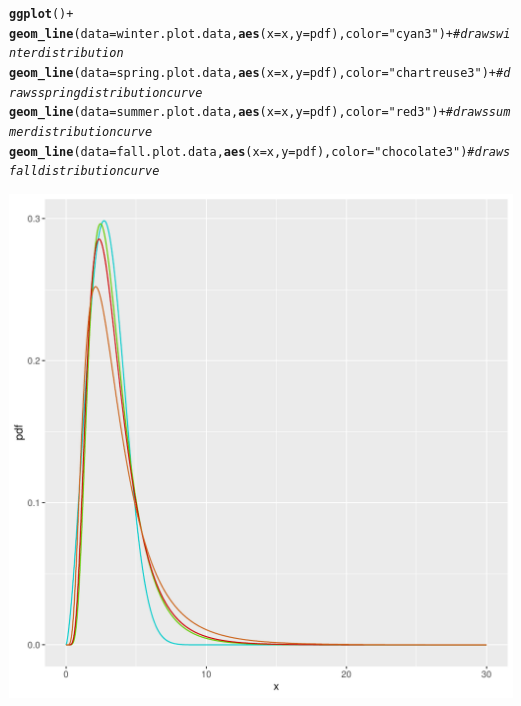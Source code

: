 \documentclass{article}\usepackage[]{graphicx}\usepackage[]{xcolor}
\makeatletter
\def\maxwidth{ %
  \ifdim\Gin@nat@width>\linewidth
    \linewidth
  \else
    \Gin@nat@width
  \fi
}
\newcommand{\hlsng}[1]{\textcolor[rgb]{0.192,0.494,0.8}{#1}}%
\newcommand{\hlcom}[1]{\textcolor[rgb]{0.678,0.584,0.686}{\textit{#1}}}%
\newcommand{\hlopt}[1]{\textcolor[rgb]{0,0,0}{#1}}%
\newcommand{\hldef}[1]{\textcolor[rgb]{0.345,0.345,0.345}{#1}}%
\newcommand{\hlkwc}[1]{\textcolor[rgb]{0.333,0.667,0.333}{#1}}%
\newcommand{\hlkwd}[1]{\textcolor[rgb]{0.737,0.353,0.396}{\textbf{#1}}}%
\newenvironment{kframe}{%
 \def\at@end@of@kframe{}%
 \ifinner\ifhmode%
  \def\at@end@of@kframe{\end{minipage}}%
  \begin{minipage}{\columnwidth}%
 \fi\fi%
 \def\FrameCommand##1{\hskip\@totalleftmargin \hskip-\fboxsep
 \colorbox{shadecolor}{##1}\hskip-\fboxsep
     \hskip-\linewidth \hskip-\@totalleftmargin \hskip\columnwidth}%
 \MakeFramed {\advance\hsize-\width
   \@totalleftmargin\z@ \linewidth\hsize
   \@setminipage}}%
 {\par\unskip\endMakeFramed%
 \at@end@of@kframe}
\newenvironment{knitrout}{}{} %
\makeatother
\begin{document}
\begin{knitrout}
\begin{kframe}
\begin{alltt}
\hlkwd{ggplot}\hldef{()} \hlopt{+}
  \hlkwd{geom_line}\hldef{(}\hlkwc{data} \hldef{= winter.plot.data,} \hlkwd{aes}\hldef{(}\hlkwc{x} \hldef{= x,} \hlkwc{y} \hldef{= pdf),} \hlkwc{color} \hldef{=} \hlsng{"cyan3"}\hldef{)} \hlopt{+} \hlcom{#draws winter distribution}
  \hlkwd{geom_line}\hldef{(}\hlkwc{data} \hldef{= spring.plot.data,} \hlkwd{aes}\hldef{(}\hlkwc{x} \hldef{= x,} \hlkwc{y} \hldef{= pdf),} \hlkwc{color} \hldef{=} \hlsng{"chartreuse3"}\hldef{)} \hlopt{+} \hlcom{#draws spring distribution curve}
  \hlkwd{geom_line}\hldef{(}\hlkwc{data} \hldef{= summer.plot.data,} \hlkwd{aes}\hldef{(}\hlkwc{x} \hldef{= x,} \hlkwc{y} \hldef{= pdf),} \hlkwc{color} \hldef{=} \hlsng{"red3"}\hldef{)} \hlopt{+} \hlcom{#draws summer distribution curve}
  \hlkwd{geom_line}\hldef{(}\hlkwc{data} \hldef{= fall.plot.data,} \hlkwd{aes}\hldef{(}\hlkwc{x} \hldef{= x,} \hlkwc{y} \hldef{= pdf),} \hlkwc{color} \hldef{=} \hlsng{"chocolate3"}\hldef{)} \hlcom{#draws fall distribution curve}
\end{alltt}
\end{kframe}
\includegraphics[width=\maxwidth]{figure/unnamed-chunk-3-1} 
\end{knitrout}



\end{document}

